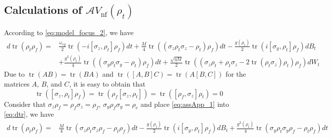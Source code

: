 \documentclass[]{elsarticle}
\begin{document}
\begin{appendices}
\section{Calculations of $\mathcal{A}V_{\mathrm{nf}}\left(\rho_{t}\right)$}\label{Sec:Appendix}
According to \eqref{eq:model_focus_2}, we have
\begin{equation}\label{eq:dtr}
	\begin{aligned}
		d \operatorname{tr}\left(\rho_t \rho_f\right)=&\frac{\omega_{eg}}{2}\operatorname{tr}\left(-{{i}}\left[\sigma_z, \rho_{t}\right]\rho_{f}\right)dt
		+\frac{M}{4}\operatorname{tr}\left(\left(\sigma_z \rho_t \sigma_z-\rho_t\right)\rho_{f}\right) dt-\frac{g\left(\rho_t\right)}{2}\operatorname{tr}\left({{i}}\left[\sigma_y, \rho_t\right]\rho_{f}\right) d B_t\\
		&+\frac{g^{2}\left(\rho_t\right)}{4}\operatorname{tr}\left(\left(\sigma_y \rho_t \sigma_y-\rho_t\right) \rho_{f}\right)d t
		+\frac{\sqrt{\eta M}}{2} \operatorname{tr}\left(\left(\sigma_z \rho_t+\rho_t \sigma_z-2 \operatorname{tr}\left(\rho_t \sigma_z\right) \rho_t\right)\rho_{f}\right) d W_t
	\end{aligned}
\end{equation}
Due to $\operatorname{tr}\left(AB\right)=\operatorname{tr}\left(BA\right)$ and $\operatorname{tr}\left(\left[A, B\right]C\right)=\operatorname{tr}\left(A\left[B, C\right]\right)$ for the matrices $A$, $B$, and $C$, it is easy to obtain that
\begin{equation}\label{eq:assApp_1}
	\operatorname{tr}\left(\left[\sigma_z, \rho_{t}\right]\rho_{f}\right)=\operatorname{tr}\left(\rho_{f}\left[\sigma_z, \rho_{t}\right]\right)=\operatorname{tr}\left(\left[\rho_{f},\sigma_z\right]\rho_{t}\right)=0
\end{equation}
Consider that $\sigma_z\rho_{f}=\rho_{f}\sigma_z=\rho_f$, $\sigma_y\rho_{f}\sigma_y=\rho_{e}$ and place \eqref{eq:assApp_1} into \eqref{eq:dtr}, we have
\begin{equation}\label{eq:dtr_1}
	\begin{aligned}
		d\operatorname{tr}\left(\rho_t \rho_f\right)
		=&\frac{M}{4}\operatorname{tr}\left(\sigma_z \rho_t \sigma_z\rho_f-\rho_t\rho_f\right) d t-\frac{g\left(\rho_t\right)}{2}\operatorname{tr}\left({{i}}\left[\sigma_y, \rho_t\right]\rho_{f}\right) d B_t
		+\frac{g^2\left(\rho_t\right)}{4}\operatorname{tr}\left(\sigma_y \rho_t \sigma_y\rho_f-\rho_t\rho_{f}\right)d t\\

\end{aligned}
\end{equation}
\end{appendices}
\end{document}
